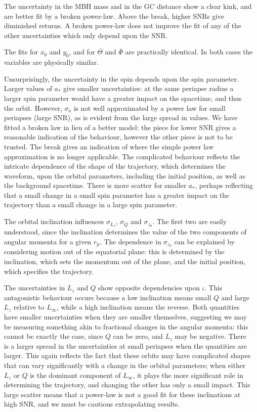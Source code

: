 \documentclass[useAMS,usedcolumn,usegraphicx,usenatbib]{mn2e}
\newcommand{\sub}[1]{\ensuremath{_\mathrm{#1}}}
\begin{document}
The uncertainty in the MBH mass and in the GC distance show a clear kink, and are better fit by a broken power-law. Above the break, higher SNRs give diminished returns. A broken power-law does not improve the fit of any of the other uncertainties which only depend upon the SNR.

The fits for $x_0$ and $y_0$, and for $\overline{\Theta}$ and $\overline{\Phi}$ are practically identical. In both cases the variables are physically similar.

Unsurprisingly, the uncertainty in the spin depends upon the spin parameter. Larger values of $a_\ast$ give smaller uncertainties: at the same periapse radius a larger spin parameter would have a greater impact on the spacetime, and thus the orbit. However, $\sigma_a$ is not well approximated by a power law for small periapses (large SNR), as is evident from the large spread in values. We have fitted a broken law in lieu of a better model: the piece for lower SNR gives a reasonable indication of the behaviour, however the other piece is not to be trusted. The break gives an indication of where the simple power law approximation is no longer applicable. The complicated behaviour reflects the intricate dependence of the shape of the trajectory, which determines the waveform, upon the orbital parameters, including the initial position, as well as the background spacetime. There is more scatter for smaller $a_\ast$, perhaps reflecting that a small change in a small spin parameter has a greater impact on the trajectory than a small change in a large spin parameter.

The orbital inclination influences $\sigma_{L_z}$, $\sigma_Q$ and $\sigma_{z_0}$. The first two are easily understood, since the inclination determines the value of the two components of angular momenta for a given $r\sub{p}$. The dependence in $\sigma_{z_0}$ can be explained by considering motion out of the equatorial plane: this is determined by the inclination, which sets the momentum out of the plane, and the initial position, which specifies the trajectory.

The uncertainties in $L_z$ and $Q$ show opposite dependencies upon $\iota$. This antagonistic behaviour occurs because a low inclination means small $Q$ and large $L_z$ relative to $L_\infty$, while a high inclination means the reverse. Both quantities have smaller uncertainties when they are smaller themselves, suggesting we may be measuring something akin to fractional changes in the angular momenta: this cannot be exactly the case, since $Q$ can be zero, and $L_z$ may be negative. There is a larger spread in the uncertainties at small periapses when the quantities are larger. This again reflects the fact that these orbits may have complicated shapes that can vary significantly with a change in the orbital parameters; when either $L_z$ or $Q$ is the dominant component of $L_\infty$, it plays the more significant role in determining the trajectory, and changing the other has only a small impact. This large scatter means that a power-law is not a good fit for these inclinations at high SNR, and we must be cautious extrapolating results.
\end{document}
